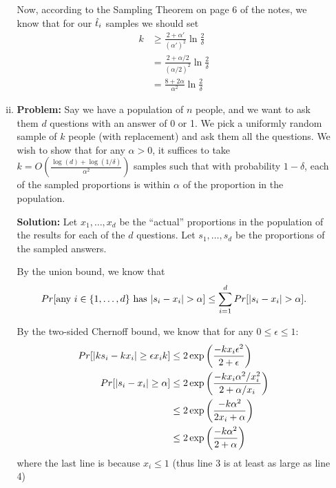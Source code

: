 \begin{enumerate}[(a)]
\begin{enumerate}[(i)]
                Now, according to the Sampling Theorem on page 6 of the notes, we know that for our $\hat{t}_i$ samples
                we should set 
                \begin{align*}
                    k &\ge \frac{2+\alpha'}{(\alpha')^2} \ln \frac{2}{\delta} \\
                    &= \frac{2 + \alpha/2}{(\alpha/2)^2} \ln \frac{2}{\delta} \\
                    &= \frac{8 + 2\alpha}{\alpha^2} \ln \frac{2}{\delta}
                \end{align*}
            \item \textbf{Problem:} Say we have a population of $n$ people, and we want to ask them $d$ questions with an answer
                of 0 or 1.  We pick a uniformly random sample of $k$ people (with replacement) and ask them all the
                questions.  We wish to show that for any $\alpha > 0$, it suffices to take $k = O(\frac{\log(d) +
                \log(1/\delta)}{\alpha^2})$ samples such that with probability $1-\delta$, each of the sampled
                proportions is within $\alpha$ of the proportion in the population.
                
                \textbf{Solution:} Let $x_1, \ldots, x_d$ be the ``actual'' proportions in the population of the results for
                each of the $d$ questions.  Let $s_1, \ldots, s_d$ be the proportions of the sampled answers.

                By the union bound, we know that 
                \[Pr[\text{any }i \in \{1,\ldots,d\}\text{ has }\vert s_i - x_i \vert >
                \alpha] \le \sum_{i=1}^d Pr[\vert s_i - x_i \vert > \alpha].\]
                
                By the two-sided Chernoff bound, we know that for any $0 \le \epsilon \le 1$: 
                \begin{align*} 
                    Pr[\vert  k s_i - k x_i  \vert \ge \epsilon x_i k] &\le 2\exp\left(\frac{-kx_i\epsilon^2}{2+\epsilon}\right) \\
                    Pr[\vert  s_i - x_i \vert \ge \alpha] &\le 2\exp\left( \frac{-kx_i\alpha^2/x_i^2}{2+\alpha/x_i} \right) \\
                    &\le 2\exp\left( \frac{-k\alpha^2}{2x_i + \alpha} \right) \\
                    &\le 2\exp\left( \frac{-k\alpha^2}{2 + \alpha} \right) \\
                \end{align*}
                where the last line is because $x_i \le 1$ (thus line 3 is at least as large as line 4)


\end{enumerate}
\end{enumerate}
